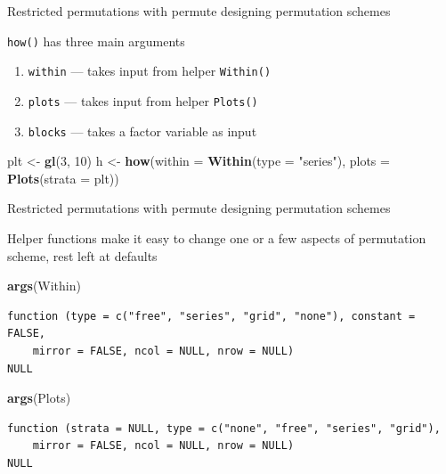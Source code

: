\documentclass[10pt,ignorenonframetext,compress, aspectratio=169]{beamer}
\newenvironment{Shaded}{\begin{snugshade}}{\end{snugshade}}
\newcommand{\KeywordTok}[1]{\textcolor[rgb]{0.13,0.29,0.53}{\textbf{{#1}}}}
\newcommand{\DataTypeTok}[1]{\textcolor[rgb]{0.13,0.29,0.53}{{#1}}}
\newcommand{\DecValTok}[1]{\textcolor[rgb]{0.00,0.00,0.81}{{#1}}}
\newcommand{\StringTok}[1]{\textcolor[rgb]{0.31,0.60,0.02}{{#1}}}
\newcommand{\NormalTok}[1]{{#1}}
\begin{document}
\begin{frame}[fragile]{Restricted permutations with permute \textbar{}
designing permutation schemes}

\texttt{how()} has three main arguments

\begin{enumerate}
\def\labelenumi{\arabic{enumi}.}
\itemsep1pt\parskip0pt
\item
  \texttt{within} --- takes input from helper \texttt{Within()}
\item
  \texttt{plots} --- takes input from helper \texttt{Plots()}
\item
  \texttt{blocks} --- takes a factor variable as input
\end{enumerate}

\scriptsize

\begin{Shaded}
\begin{Highlighting}[]
\NormalTok{plt <-}\StringTok{ }\KeywordTok{gl}\NormalTok{(}\DecValTok{3}\NormalTok{, }\DecValTok{10}\NormalTok{)}
\NormalTok{h <-}\StringTok{ }\KeywordTok{how}\NormalTok{(}\DataTypeTok{within =} \KeywordTok{Within}\NormalTok{(}\DataTypeTok{type =} \StringTok{"series"}\NormalTok{), }\DataTypeTok{plots =} \KeywordTok{Plots}\NormalTok{(}\DataTypeTok{strata =} \NormalTok{plt))}
\end{Highlighting}
\end{Shaded}

\normalsize

\end{frame}

\begin{frame}[fragile]{Restricted permutations with permute \textbar{}
designing permutation schemes}

Helper functions make it easy to change one or a few aspects of
permutation scheme, rest left at defaults

\scriptsize

\begin{Shaded}
\begin{Highlighting}[]
\KeywordTok{args}\NormalTok{(Within)}
\end{Highlighting}
\end{Shaded}

\begin{verbatim}
function (type = c("free", "series", "grid", "none"), constant = FALSE, 
    mirror = FALSE, ncol = NULL, nrow = NULL) 
NULL
\end{verbatim}

\begin{Shaded}
\begin{Highlighting}[]
\KeywordTok{args}\NormalTok{(Plots)}
\end{Highlighting}
\end{Shaded}

\begin{verbatim}
function (strata = NULL, type = c("none", "free", "series", "grid"), 
    mirror = FALSE, ncol = NULL, nrow = NULL) 
NULL
\end{verbatim}

\normalsize

\end{frame}
\end{document}
